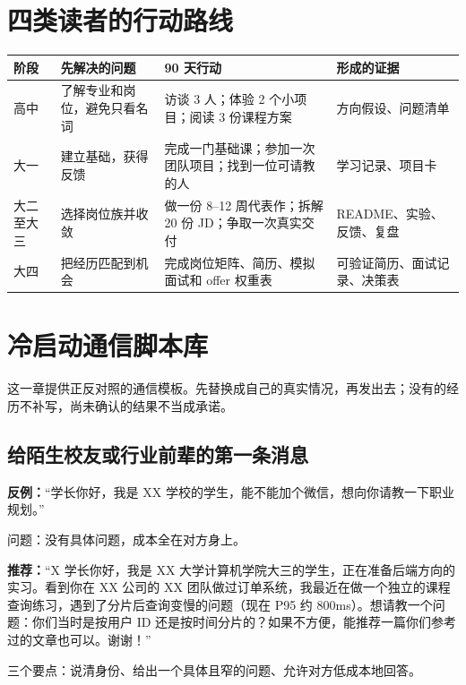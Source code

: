 \documentclass[UTF8,zihao=5,openany]{ctexbook}
\begin{document}
\chapter{四类读者的行动路线}
\begin{longtable}{p{}p{}p{}p{}}
\toprule
阶段 & 先解决的问题 & 90 天行动 & 形成的证据 \\
\midrule
\endhead
高中 & 了解专业和岗位，避免只看名词 & 访谈 3 人；体验 2 个小项目；阅读 3 份课程方案 & 方向假设、问题清单 \\
大一 & 建立基础，获得反馈 & 完成一门基础课；参加一次团队项目；找到一位可请教的人 & 学习记录、项目卡 \\
大二至大三 & 选择岗位族并收敛 & 做一份 8--12 周代表作；拆解 20 份 JD；争取一次真实交付 & README、实验、反馈、复盘 \\
大四 & 把经历匹配到机会 & 完成岗位矩阵、简历、模拟面试和 offer 权重表 & 可验证简历、面试记录、决策表 \\
\bottomrule
\end{longtable}

\chapter{冷启动通信脚本库}
这一章提供正反对照的通信模板。先替换成自己的真实情况，再发出去；没有的经历不补写，尚未确认的结果不当成承诺。

\section{给陌生校友或行业前辈的第一条消息}
\begin{casebox}
\textbf{反例：}“学长你好，我是 XX 学校的学生，能不能加个微信，想向你请教一下职业规划。”
\end{casebox}

问题：没有具体问题，成本全在对方身上。

\begin{casebox}
\textbf{推荐：}“X 学长你好，我是 XX 大学计算机学院大三的学生，正在准备后端方向的实习。看到你在 XX 公司的 XX 团队做过订单系统，我最近在做一个独立的课程查询练习，遇到了分片后查询变慢的问题（现在 P95 约 800ms）。想请教一个问题：你们当时是按用户 ID 还是按时间分片的？如果不方便，能推荐一篇你们参考过的文章也可以。谢谢！”
\end{casebox}

三个要点：说清身份、给出一个具体且窄的问题、允许对方低成本地回答。
\end{document}
